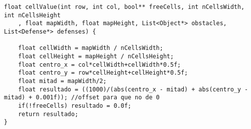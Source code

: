 \begin{lstlisting}
float cellValue(int row, int col, bool** freeCells, int nCellsWidth, int nCellsHeight
	, float mapWidth, float mapHeight, List<Object*> obstacles, List<Defense*> defenses) {

    float cellWidth = mapWidth / nCellsWidth; 
    float cellHeight = mapHeight / nCellsHeight; 
    float centro_x = col*cellWidth+cellWidth*0.5f;
    float centro_y = row*cellHeight+cellHeight*0.5f;
    float mitad = mapWidth/2;
    float resultado = ((1000)/(abs(centro_x - mitad) + abs(centro_y - mitad) + 0.001f)); //offset para que no de 0
    if(!freeCells) resultado = 0.0f;
	return resultado; 
}
\end{lstlisting}
